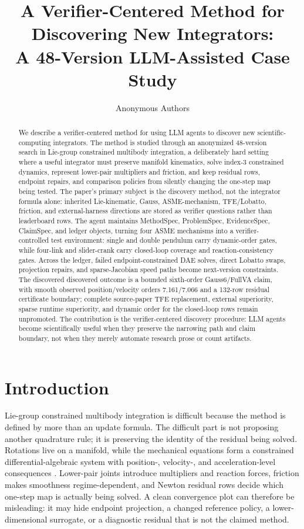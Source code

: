 \documentclass[10pt]{article}
\title{A Verifier-Centered Method for Discovering New Integrators:\\
A 48-Version LLM-Assisted Case Study}
\author{Anonymous Authors}
\date{}
\newcommand{\method}{Gauss6/\allowbreak FullVA}
\newcommand{\tfe}{TFE}
\begin{document}
\maketitle

\begin{abstract}
We describe a verifier-centered method for using LLM agents to discover new
scientific-computing integrators. The method is studied through an anonymized
48-version search in Lie-group constrained multibody integration, a deliberately
hard setting where a useful integrator must preserve manifold kinematics, solve
index-3 constrained dynamics, represent lower-pair multipliers and friction,
and keep residual rows, endpoint repairs, and comparison policies from
silently changing the one-step map being tested. The paper's primary subject is
the discovery method, not the integrator formula alone: inherited
Lie-kinematic, Gauss, ASME-mechanism, \tfe{}/Lobatto, friction, and
external-harness directions are stored as verifier questions rather than
leaderboard rows. The agent maintains MethodSpec, ProblemSpec, EvidenceSpec,
ClaimSpec, and ledger objects, turning four ASME mechanisms into a
verifier-controlled test environment: single and double pendulum carry
dynamic-order gates, while four-link and slider-crank carry closed-loop
coverage and reaction-consistency gates. Across the ledger, failed
endpoint-constrained DAE solves, direct Lobatto swaps, projection repairs, and
sparse-Jacobian speed paths become next-version constraints. The discovered
discovered outcome is a bounded sixth-order \method{} claim, with smooth observed
position/velocity orders 7.161/7.066 and a 132-row residual certificate
boundary; complete source-paper \tfe{} replacement, external superiority,
sparse runtime superiority, and dynamic order for the closed-loop rows remain
unpromoted. The contribution is the verifier-centered discovery procedure:
LLM agents become scientifically useful when they preserve the narrowing path
and claim boundary, not when they merely automate research prose or count
artifacts.
\end{abstract}

\section{Introduction}

Lie-group constrained multibody integration is difficult because the method is
defined by more than an update formula. The difficult part is not proposing
another quadrature rule; it is preserving the identity of the residual being
solved. Rotations live on a manifold, while the mechanical equations form a
constrained differential-algebraic system with position-, velocity-, and
acceleration-level consequences
\citep{Hairer1996SolvingII,MuntheKaas1998RK}. Lower-pair joints introduce
multipliers and reaction forces, friction makes smoothness regime-dependent,
and Newton residual rows decide which one-step map is actually being solved.
A clean convergence plot can therefore be misleading: it may hide endpoint
projection, a changed reference policy, a lower-dimensional surrogate, or a
diagnostic residual that is not the claimed method.
\end{document}
